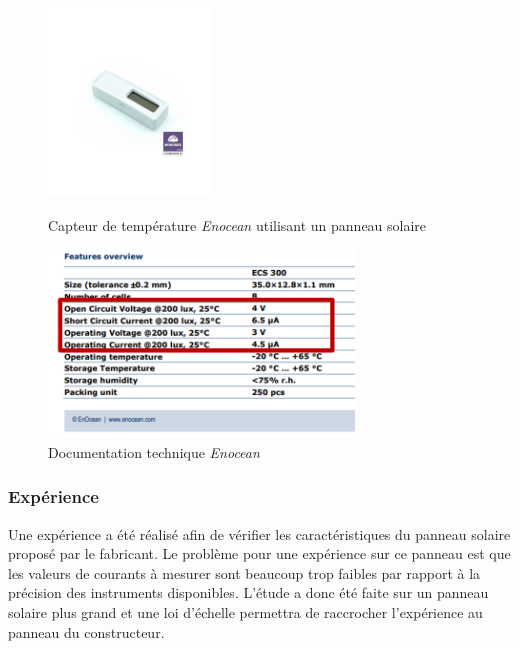 \documentclass{rapportENS}
\begin{document}
 \begin{figure}[h!]
     \centering
      \begin{minipage}[c]{0.5\linewidth}
      \centering
     \includegraphics[width=0.7\linewidth,height=5cm] {capteur_pv.jpg}
     \caption{Capteur de température \textit{Enocean} utilisant un panneau solaire}
     \label{fig:capteur_pv}
     \end{minipage}\hfill
      \begin{minipage}[c]{0.5\linewidth}
      \centering
     \includegraphics[width=0.9\linewidth,height=5cm]{doc_pv.png}
     \caption{Documentation technique  \textit{Enocean}}
     \label{fig:doc_pv}
     \end{minipage}\hfill
 \end{figure}
 
 \subsubsection{Expérience}
 Une expérience a été réalisé afin de vérifier les caractéristiques du panneau solaire proposé par le fabricant. Le problème pour une expérience sur ce panneau est que les valeurs de courants à mesurer sont beaucoup trop faibles par rapport à la précision des instruments disponibles. L'étude a donc été faite sur un panneau solaire plus grand et une loi d'échelle permettra de raccrocher l'expérience au panneau du constructeur.
 
\end{document}
